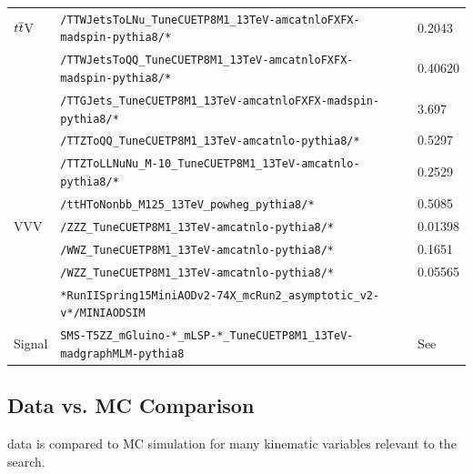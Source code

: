\begin{table}
\begin{center}
\begin{tabular}{l|l|l}
\hline
${\relax{t}\overline{\relax{t}}}$V & \verb=/TTWJetsToLNu_TuneCUETP8M1_13TeV-amcatnloFXFX-madspin-pythia8/*=      & 0.2043       \\
            & \verb=/TTWJetsToQQ_TuneCUETP8M1_13TeV-amcatnloFXFX-madspin-pythia8/*=       & 0.40620      \\
            & \verb=/TTGJets_TuneCUETP8M1_13TeV-amcatnloFXFX-madspin-pythia8/*=           & 3.697        \\
            & \verb=/TTZToQQ_TuneCUETP8M1_13TeV-amcatnlo-pythia8/*=                       & 0.5297       \\
            & \verb=/TTZToLLNuNu_M-10_TuneCUETP8M1_13TeV-amcatnlo-pythia8/*=              & 0.2529       \\
            & \verb=/ttHToNonbb_M125_13TeV_powheg_pythia8/*=                              & 0.5085       \\
\hline
VVV         & \verb=/ZZZ_TuneCUETP8M1_13TeV-amcatnlo-pythia8/*=                           & 0.01398      \\
            & \verb=/WWZ_TuneCUETP8M1_13TeV-amcatnlo-pythia8/*=                           & 0.1651       \\
            & \verb=/WZZ_TuneCUETP8M1_13TeV-amcatnlo-pythia8/*=                           & 0.05565      \\
\hline
            & \verb=*RunIISpring15MiniAODv2-74X_mcRun2_asymptotic_v2-v*/MINIAODSIM=       &              \\
\hline
Signal      & \verb=SMS-T5ZZ_mGluino-*_mLSP-*_TuneCUETP8M1_13TeV-madgraphMLM-pythia8=     & See~\cite{gluinoxsec13tev} \\
\hline
\hline
\end{tabular}
\end{center}
\end{table}

\clearpage

\subsection{Data vs. MC Comparison}
\label{ssec:datavsmc}
data is compared to MC simulation for many kinematic variables relevant to the search.

